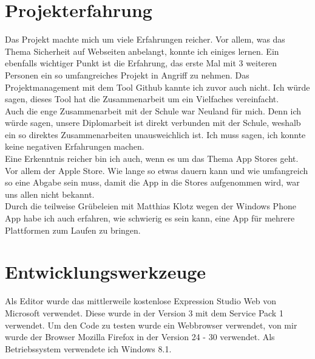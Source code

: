 \section{Projekterfahrung}
Das Projekt machte mich um viele Erfahrungen reicher. Vor allem, was das Thema Sicherheit auf Webseiten anbelangt, konnte ich einiges lernen. Ein ebenfalls wichtiger Punkt ist die Erfahrung, das erste Mal mit 3 weiteren Personen ein so umfangreiches Projekt in Angriff zu nehmen. Das Projektmanagement mit dem Tool Github kannte ich zuvor auch nicht. Ich würde sagen, dieses Tool hat die Zusammenarbeit um ein Vielfaches vereinfacht.\\
Auch die enge Zusammenarbeit mit der Schule war Neuland für mich. Denn ich würde sagen, unsere Diplomarbeit ist direkt verbunden mit der Schule, weshalb ein so direktes Zusammenarbeiten unausweichlich ist. Ich muss sagen, ich konnte keine negativen Erfahrungen machen.\\
Eine Erkenntnis reicher bin ich auch, wenn es um das Thema App Stores geht. Vor allem der Apple Store. Wie lange so etwas dauern kann und wie umfangreich so eine Abgabe sein muss, damit die App in die Stores aufgenommen wird, war uns allen nicht bekannt.\\
Durch die teilweise Grübeleien mit Matthias Klotz wegen der Windows Phone App habe ich auch erfahren, wie schwierig es sein kann, eine App für mehrere Plattformen zum Laufen zu bringen. \\

\section{Entwicklungswerkzeuge}
Als Editor wurde das mittlerweile kostenlose Expression Studio Web von Microsoft verwendet. Diese wurde in der Version 3 mit dem Service Pack 1 verwendet. Um den Code zu testen wurde ein Webbrowser verwendet, von mir wurde der Browser Mozilla Firefox in der Version 24 - 30 verwendet. Als Betriebssystem verwendete ich Windows 8.1.